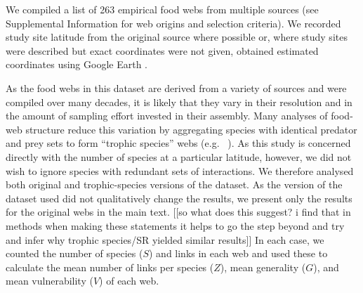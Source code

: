 \documentclass[12pt]{article}
\begin{document}
We compiled a list of 263 empirical food webs from
multiple sources (see Supplemental Information for web origins and selection
criteria). We recorded study site latitude from the original source where
possible or, where study sites were described but exact coordinates were not
given, obtained estimated coordinates using Google Earth \citep{GoogleEarth}.



As the food webs in this dataset are derived from a variety of sources and were compiled over many decades, it
is likely that they vary in their resolution and in the amount of sampling effort invested in their assembly.
Many analyses of food-web structure reduce this variation by aggregating species with identical predator and prey
sets to form ``trophic species'' webs (e.g. ~\citep{Martinez1991,Vermaat2009,Dunne2004,Dunne2013}). As this study
is concerned directly with the number of species at a particular latitude, however, we did not wish to ignore 
species with redundant sets of interactions. We therefore analysed both original and trophic-species versions
of the dataset. As the version of the dataset used did not qualitatively change the results, we present only
the results for the original webs in the main text. [[so what does this suggest? i find that in methods when making these statements it helps to go the step beyond and try and infer why trophic species/SR yielded similar results]] In each case, we counted the number of species ($S$) and 
links in each web and used these to calculate the mean number of links per species ($Z$), mean generality 
($G$), and mean vulnerability ($V$) of each web. 
\end{document}
